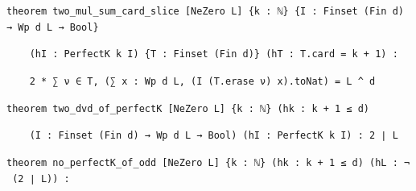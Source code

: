 \documentclass[11pt,a4paper]{article}
\theoremstyle{named}
\begin{document}
\begin{leancode}
\smallskip
\item \texttt{theorem\ \allowbreak{}two\_\allowbreak{}mul\_\allowbreak{}sum\_\allowbreak{}card\_\allowbreak{}slice\ \allowbreak{}[NeZero\ \allowbreak{}L]\ \allowbreak{}\{k\ \allowbreak{}:\ \allowbreak{}ℕ\}\ \allowbreak{}\{I\ \allowbreak{}:\ \allowbreak{}Finset\ \allowbreak{}(Fin\ \allowbreak{}d)\ \allowbreak{}→\ \allowbreak{}Wp\ \allowbreak{}d\ \allowbreak{}L\ \allowbreak{}→\ \allowbreak{}Bool\}}
\item \texttt{\ \allowbreak{}\ \allowbreak{}\ \allowbreak{}\ \allowbreak{}(hI\ \allowbreak{}:\ \allowbreak{}PerfectK\ \allowbreak{}k\ \allowbreak{}I)\ \allowbreak{}\{T\ \allowbreak{}:\ \allowbreak{}Finset\ \allowbreak{}(Fin\ \allowbreak{}d)\}\ \allowbreak{}(hT\ \allowbreak{}:\ \allowbreak{}T.\allowbreak{}card\ \allowbreak{}=\ \allowbreak{}k\ \allowbreak{}+\ \allowbreak{}1)\ \allowbreak{}:}
\item \texttt{\ \allowbreak{}\ \allowbreak{}\ \allowbreak{}\ \allowbreak{}2\ \allowbreak{}*\ \allowbreak{}∑\ \allowbreak{}ν\ \allowbreak{}∈\ \allowbreak{}T,\ \allowbreak{}(∑\ \allowbreak{}x\ \allowbreak{}:\ \allowbreak{}Wp\ \allowbreak{}d\ \allowbreak{}L,\ \allowbreak{}(I\ \allowbreak{}(T.\allowbreak{}erase\ \allowbreak{}ν)\ \allowbreak{}x).\allowbreak{}toNat)\ \allowbreak{}=\ \allowbreak{}L\ \allowbreak{}\textasciicircum{}\ \allowbreak{}d}
\smallskip
\item \texttt{theorem\ \allowbreak{}two\_\allowbreak{}dvd\_\allowbreak{}of\_\allowbreak{}perfectK\ \allowbreak{}[NeZero\ \allowbreak{}L]\ \allowbreak{}\{k\ \allowbreak{}:\ \allowbreak{}ℕ\}\ \allowbreak{}(hk\ \allowbreak{}:\ \allowbreak{}k\ \allowbreak{}+\ \allowbreak{}1\ \allowbreak{}≤\ \allowbreak{}d)}
\item \texttt{\ \allowbreak{}\ \allowbreak{}\ \allowbreak{}\ \allowbreak{}(I\ \allowbreak{}:\ \allowbreak{}Finset\ \allowbreak{}(Fin\ \allowbreak{}d)\ \allowbreak{}→\ \allowbreak{}Wp\ \allowbreak{}d\ \allowbreak{}L\ \allowbreak{}→\ \allowbreak{}Bool)\ \allowbreak{}(hI\ \allowbreak{}:\ \allowbreak{}PerfectK\ \allowbreak{}k\ \allowbreak{}I)\ \allowbreak{}:\ \allowbreak{}2\ \allowbreak{}∣\ \allowbreak{}L}
\smallskip
\item \texttt{theorem\ \allowbreak{}no\_\allowbreak{}perfectK\_\allowbreak{}of\_\allowbreak{}odd\ \allowbreak{}[NeZero\ \allowbreak{}L]\ \allowbreak{}\{k\ \allowbreak{}:\ \allowbreak{}ℕ\}\ \allowbreak{}(hk\ \allowbreak{}:\ \allowbreak{}k\ \allowbreak{}+\ \allowbreak{}1\ \allowbreak{}≤\ \allowbreak{}d)\ \allowbreak{}(hL\ \allowbreak{}:\ \allowbreak{}¬\ \allowbreak{}(2\ \allowbreak{}∣\ \allowbreak{}L))\ \allowbreak{}:}

\end{leancode}
\end{document}
